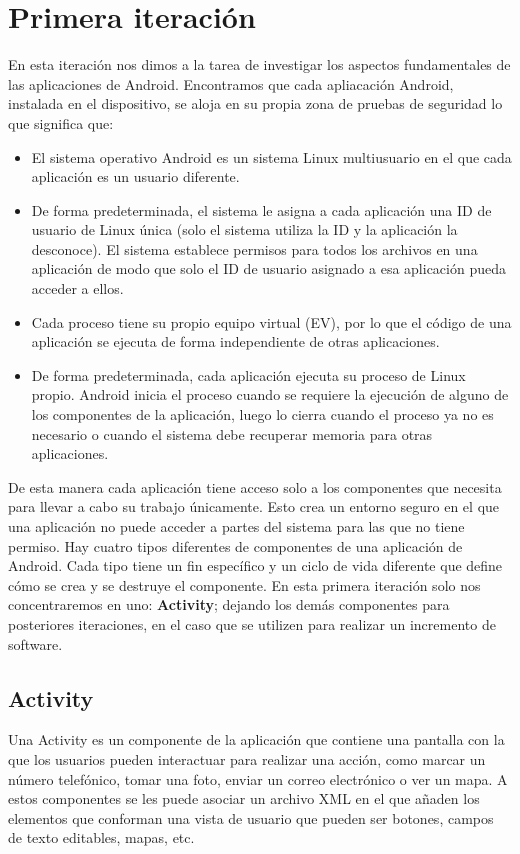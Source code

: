 \section{Primera iteración}
\noindent
En esta iteración nos dimos a la tarea de investigar los aspectos fundamentales de las aplicaciones de Android. Encontramos que cada apliacación Android, instalada en el dispositivo, se aloja en su propia zona de pruebas de seguridad lo que significa que:
\begin{itemize}
	\item El sistema operativo Android es un sistema Linux multiusuario en el que cada aplicación es un usuario diferente.
	\item De forma predeterminada, el sistema le asigna a cada aplicación una ID de usuario de Linux única (solo el sistema utiliza la ID y la aplicación la desconoce). El sistema establece permisos para todos los archivos en una aplicación de modo que solo el ID de usuario asignado a esa aplicación pueda acceder a ellos.
	\item Cada proceso tiene su propio equipo virtual (EV), por lo que el código de una aplicación se ejecuta de forma independiente de otras aplicaciones.
	\item De forma predeterminada, cada aplicación ejecuta su proceso de Linux propio. Android inicia el proceso cuando se requiere la ejecución de alguno de los componentes de la aplicación, luego lo cierra cuando el proceso ya no es necesario o cuando el sistema debe recuperar memoria para otras aplicaciones.
\end{itemize}

\noindent
De esta manera cada aplicación tiene acceso solo a los componentes que necesita para llevar a cabo su trabajo únicamente. Esto crea un entorno seguro en el que una aplicación no puede acceder a partes del sistema para las que no tiene permiso.  \cite{fundamentalsAndroid} 
Hay cuatro tipos diferentes de componentes de una aplicación de Android. \label{componentes_android}Cada tipo tiene un fin específico y un ciclo de vida diferente que define cómo se crea y se destruye el componente. En esta primera iteración solo nos concentraremos en uno: \textbf{Activity}; dejando los demás componentes para posteriores iteraciones, en el caso que se utilizen para realizar un incremento de software.

\subsection{Activity} \label{sec_activity}
\noindent
Una Activity es un componente de la aplicación que contiene una pantalla con la que los usuarios pueden interactuar para realizar una acción, como marcar un número telefónico, tomar una foto, enviar un correo electrónico o ver un mapa. A estos componentes se les puede asociar un archivo XML en el que añaden los elementos que conforman una vista de usuario que pueden ser botones, campos de texto editables, mapas, etc.

